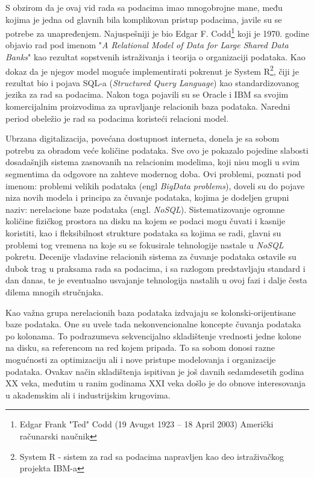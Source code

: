 \documentclass[12pt,oneside]{memoir}
\begin{document}
S obzirom da je ovaj vid rada sa podacima imao mnogobrojne mane, među kojima je jedna od glavnih bila komplikovan pristup podacima, javile su se potrebe za unapređenjem. Najuspešniji je bio Edgar F. Codd\footnote{Edgar Frank "Ted" Codd (19 Avugst 1923 – 18 April 2003) Američki računarski naučnik }  koji je 1970. godine objavio rad pod imenom "\textit{A Relational Model of Data for Large Shared Data Banks}" kao rezultat sopstvenih istraživanja i teorija o organizaciji podataka.  Kao dokaz da je njegov model moguće implementirati pokrenut je System R\footnote{System R - sistem za rad sa podacima napravljen kao deo istraživačkog projekta IBM-a}, čiji je rezultat bio i pojava SQL-a (\textit{Structured Query Language}) kao standardizovanog jezika za rad sa podacima. Nakon toga pojavili su se Oracle i IBM sa svojim komercijalnim proizvodima za upravljanje relacionih baza podataka. Naredni period obeležio je rad sa podacima koristeći relacioni model.  

Ubrzana digitalizacija, povećana dostupnost interneta, donela je sa sobom potrebu za obradom veće količine podataka. Sve ovo je pokazalo pojedine slabosti dosadašnjih sistema zasnovanih na relacionim modelima, koji nisu mogli u svim segmentima da odgovore na zahteve modernog doba. Ovi problemi, poznati pod imenom: problemi velikih podataka (engl \textit{BigData problems}), doveli su do pojave niza novih modela i principa za čuvanje podataka, kojima je dodeljen  grupni naziv: nerelacione baze podataka (engl. \textit{NoSQL}).
Sistematizovanje ogromne količine fizičkog prostora na disku na kojem se podaci mogu čuvati i kasnije koristiti, kao i fleksibilnost strukture podataka sa kojima se radi, glavni su problemi tog vremena na koje su se fokusirale tehnologije nastale u \textit{NoSQL} pokretu.
Decenije vladavine  relacionih sistema za čuvanje podataka ostavile su dubok trag u praksama rada sa podacima, i sa razlogom predstavljaju standard i dan danas, te je eventualno usvajanje tehnologija nastalih u ovoj fazi i dalje  česta dilema mnogih stručnjaka. 

Kao važna grupa nerelacionih baza podataka izdvajaju se kolonski-orijentisane baze podataka. One su uvele tada nekonvencionalne koncepte čuvanja podataka po kolonama. To podrazumeva sekvencijalno skladištenje vrednosti jedne kolone na disku, sa referencom na red kojem pripada. To sa sobom donosi razne mogućnosti za optimizaciju ali i nove pristupe modelovanja i organizacije podataka. Ovakav način skladištenja ispitivan je još davnih sedamdesetih godina XX veka, međutim u ranim godinama XXI veka došlo je do obnove interesovanja u akademskim ali i industrijskim krugovima. 
\end{document}
